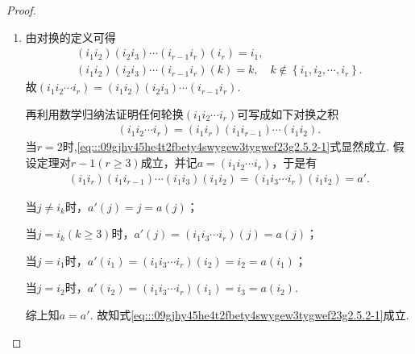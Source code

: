 \documentclass[../../main.tex]{subfiles}%
\begin{document}
\begin{proof}
\begin{enumerate}[(1)]
\item 由对换的定义可得
\begin{gather*}
(i_1i_2)(i_2i_3)\cdots (i_{r-1}i_r)\left( i_r \right) =i_1,
\\
(i_1i_2)(i_2i_3)\cdots (i_{r-1}i_r)\left( k \right) =k,\quad k\notin \left\{ i_1,i_2,\cdots ,i_r \right\} .
\end{gather*}
故$(i_1i_2\cdots i_r)=(i_1i_2)(i_2i_3)\cdots (i_{r-1}i_r).$

再利用数学归纳法证明任何轮换$(i_1 i_2 \cdots i_r)$可写成如下对换之积
\begin{align}
(i_1 i_2 \cdots i_r) = (i_1 i_r)(i_1 i_{r-1}) \cdots (i_1 i_2). \label{eq:::09gjhy45he4t2fbety4swygew3tygwef23g2.5.2-1}
\end{align}
当$r = 2$时,\eqref{eq:::09gjhy45he4t2fbety4swygew3tygwef23g2.5.2-1}式显然成立. 假设定理对$r - 1(r \geqslant 3)$成立，并记$a = (i_1 i_2 \cdots i_r)$，于是有
\begin{align*}
(i_1 i_r)(i_1 i_{r-1}) \cdots (i_1 i_3)(i_1 i_2) = (i_1 i_3 \cdots i_r)(i_1 i_2) = a'.
\end{align*}

当$j \neq i_k$时，$a'(j) = j = a(j)$；

当$j = i_k(k \geqslant 3)$时，$a'(j) = (i_1 i_3 \cdots i_r)(j) = a(j)$；

当$j = i_1$时，$a'(i_1) = (i_1 i_3 \cdots i_r)(i_2) = i_2 = a(i_1)$；

当$j = i_2$时，$a'(i_2) = (i_1 i_3 \cdots i_r)(i_1) = i_3 = a(i_2)$.

综上知$a=a'.$
故知式\eqref{eq:::09gjhy45he4t2fbety4swygew3tygwef23g2.5.2-1}成立.
\end{enumerate}
\end{proof}
\end{document}
